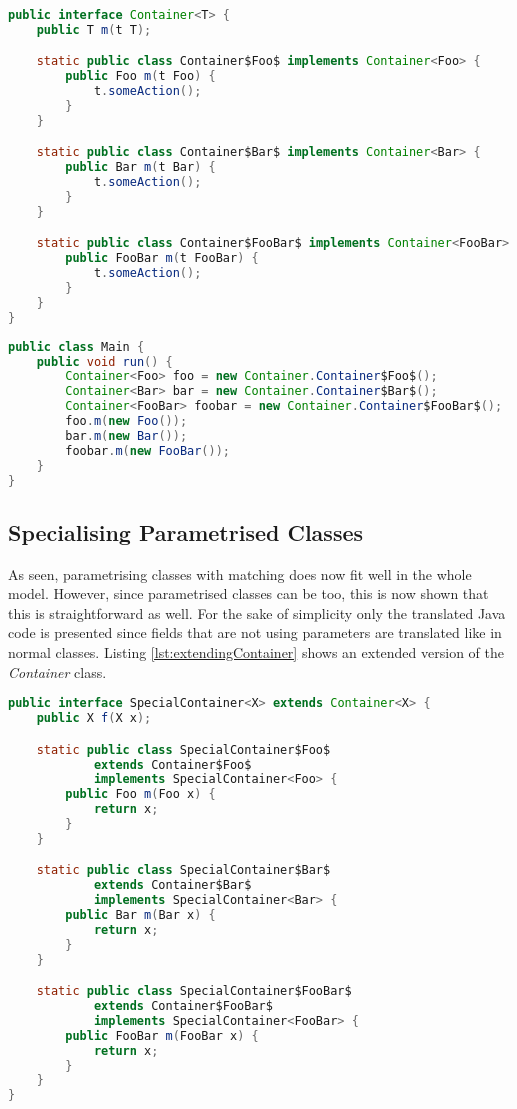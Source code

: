 \begin{lstlisting}[float,language=java,caption=Container class translated to Java,label=lst:parametrisationJava]
public interface Container<T> {
	public T m(t T);

	static public class Container$Foo$ implements Container<Foo> {
		public Foo m(t Foo) {
			t.someAction();
		}
	}

	static public class Container$Bar$ implements Container<Bar> {
		public Bar m(t Bar) {
			t.someAction();
		}
	}

	static public class Container$FooBar$ implements Container<FooBar> {
		public FooBar m(t FooBar) {
			t.someAction();
		}
	}
}
\end{lstlisting}

\begin{lstlisting}[float,language=java,caption=Use of parametised classes in Java,label=lst:useParametrisationJava]
public class Main {
	public void run() {
		Container<Foo> foo = new Container.Container$Foo$();
		Container<Bar> bar = new Container.Container$Bar$();
		Container<FooBar> foobar = new Container.Container$FooBar$();
		foo.m(new Foo());
		bar.m(new Bar());
		foobar.m(new FooBar());
	}
}
\end{lstlisting}

\subsection{Specialising Parametrised Classes}
As seen, parametrising classes with matching does now fit well in
the whole model. However, since parametrised classes can be too,
this is now shown that this is straightforward as well. For the
sake of simplicity only the translated Java code is presented since
fields that are not using parameters are translated like in normal
classes. Listing \ref{lst:extendingContainer} shows an extended version
of the \emph{Container} class.

\begin{lstlisting}[float,language=java,caption=Extending a container class translated to Java,label=lst:extendingContainer]
public interface SpecialContainer<X> extends Container<X> {
	public X f(X x);

	static public class SpecialContainer$Foo$ 
			extends Container$Foo$ 
			implements SpecialContainer<Foo> {
		public Foo m(Foo x) {
			return x;
		}
	}

	static public class SpecialContainer$Bar$ 
			extends Container$Bar$ 
			implements SpecialContainer<Bar> {
		public Bar m(Bar x) {
			return x;
		}
	}

	static public class SpecialContainer$FooBar$ 
			extends Container$FooBar$ 
			implements SpecialContainer<FooBar> {
		public FooBar m(FooBar x) {
			return x;
		}
	}
}
\end{lstlisting}


